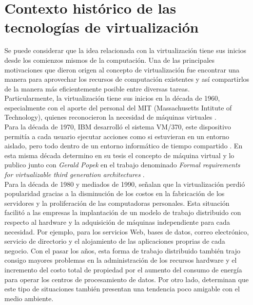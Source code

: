 \section{Contexto histórico de las tecnologías de virtualización} \label{sec:historia}
\vspace{5mm}
Se puede considerar que la idea relacionada con la virtualización tiene sus inicios desde los comienzos mismos de la computación. Una de las principales motivaciones que dieron origen al concepto de virtualización fue encontrar una manera para aprovechar los recursos de computación existentes y así compartirlos de la manera más eficientemente posible entre diversas tareas. \\

Particularmente, la virtualización tiene sus inicios en la década de 1960, especialmente con el aporte del personal del MIT (Massachusetts Intitute of Technology), quienes reconocieron la necesidad de máquinas virtuales \parencite{ Varian1997, Ameen2013}.\\ 

Para la década de 1970, IBM desarrolló el sistema VM/370, este dispositivo permitía a cada usuario ejecutar acciones como si estuvieran en un entorno aislado, pero todo dentro de un entorno informático de tiempo compartido \parencite{Douglis2013, Varian1997}. En esta misma década \textcite{Goldberg1973} determino en su tesis el concepto de máquina virtual y lo publico junto con \textit{Gerald Popek} en el trabajo  denominado \textit{Formal requirements for virtualizable third generation architectures} \parencite{Popek1974}.\\

Para la década de 1980 y mediados de 1990, \textcite{Varasteh2017,Agrawal2013} señalan que la virtualización perdió popularidad gracias a la disminución de los costos en la fabricación de los servidores y la proliferación de las computadoras personales. Esta situación facilitó a las empresas la implantación de un modelo de trabajo distribuido con respecto al hardware y la  adquisición de máquinas independiente para cada necesidad. Por ejemplo, para los servicios Web, bases de datos, correo electrónico, servicio de directorio y el alojamiento de las aplicaciones proprias de cada negocio. Con el pasar los años, esta forma de trabajo distribuido también trajo consigo mayores problemas en la administración de los recursos hardware y el incremento del costo total de propiedad por el aumento del consumo de energía para operar los centros de procesamiento de datos. Por otro lado, \textcite{Ranjith2017} determinan que este tipo de situaciones también presentan una tendencia poco amigable con el medio ambiente. \\

